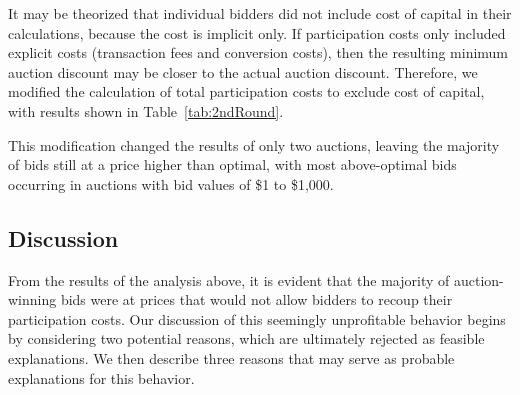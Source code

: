 \documentclass[conference]{IEEEtran}
\newcommand{\ra}[1]{\renewcommand{\arraystretch}{1.2}}
\begin{document}
It may be theorized that individual bidders did not include cost of capital in their calculations, because the cost is implicit only. If participation costs only included explicit costs (transaction fees and conversion costs), then the resulting minimum auction discount may be closer to the actual auction discount. Therefore, we modified the calculation of total participation costs to exclude cost of capital, with results shown in Table~\ref{tab:2ndRound}.
\begin{table}[htb]
    \caption{Optimization results, with cost of capital excluded}
    \centering
    \ra{1.3}
    \label{tab:2ndRound}
\end{table}

This modification changed the results of only two auctions, leaving the majority of bids still at a price higher than optimal, with most above-optimal bids occurring in auctions with bid values of \$1 to \$1,000.

\subsection{Discussion}
\label{sec:discussion}
From the results of the analysis above, it is evident that the majority of auction-winning bids were at prices that would not allow bidders to recoup their participation costs. Our discussion of this seemingly unprofitable behavior begins by considering two potential reasons, which are ultimately rejected as feasible explanations. We then describe three reasons that may serve as probable explanations for this behavior.
\newline
\end{document}
